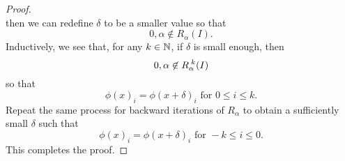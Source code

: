 \documentclass[10pt,twoside,draft]{book}
\begin{document}
\begin{example}
\begin{lemma}
\begin{proof}
\begin{equation*}
  \end{equation*}
  then we can redefine $\delta$ to be a smaller value so that 
  \begin{equation*} 
    0, \alpha \not\in R_\alpha(I).
  \end{equation*}
  Inductively, we see that, for any $k \in \mathbb{N}$, if $\delta$ is small enough, then 
  \begin{equation*}
    0, \alpha \not\in R_\alpha^{\;k}(I)
  \end{equation*}
  so that
  \begin{equation*}
    \phi(x)_i = \phi(x+\delta)_i \mbox{ for } 0 \leq i \leq k.
  \end{equation*}
  Repeat the same process for backward iterations of $R_\alpha$ to obtain a sufficiently small $\delta$ such that
  \begin{equation*}
    \phi(x)_i = \phi(x+\delta)_i \mbox{ for } -k \leq i \leq 0.
  \end{equation*}
  This completes the proof.
\end{proof}
  \end{lemma}


\end{example}
\end{document}
